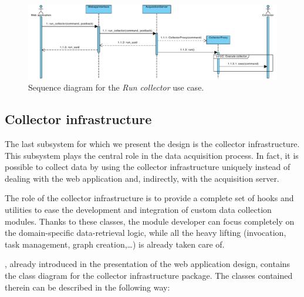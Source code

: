 \begin{figure}
  \begin{adjustwidth}{-7.4mm}{-1.5cm}
    \includegraphics[width=\linewidth]{images/seq-run-collector}
  \end{adjustwidth}
  \caption{Sequence diagram for the \emph{Run collector} use case.}
  \label{fig:seq-run-collector}
\end{figure}


\subsection{Collector infrastructure}

The last subsystem for which we present the design is the collector infrastructure. This subsystem plays the central role in the data acquisition process. In fact, it is possible to collect data by using the collector infrastructure uniquely instead of dealing with the web application and, indirectly, with the acquisition server.

The role of the collector infrastructure is to provide a complete set of hooks and utilities to ease the development and integration of custom data collection modules. Thanks to these classes, the module developer can focus completely on the domain-specific data-retrieval logic, while all the heavy lifting (invocation, task management, graph creation,\ldots) is already taken care of.

, already introduced in the presentation of the web application design, contains the class diagram for the collector infrastructure package. The classes contained therein can be described in the following way:

